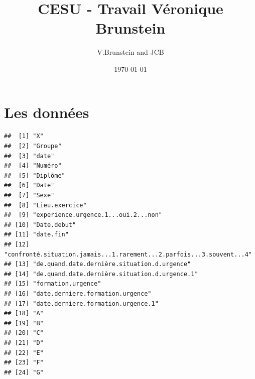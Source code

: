 \documentclass[12pt,english,french]{article}\usepackage{graphicx, color}
\makeatletter
\newenvironment{kframe}{%
 \def\at@end@of@kframe{}%
 \ifinner\ifhmode%
  \def\at@end@of@kframe{\end{minipage}}%
  \begin{minipage}{\columnwidth}%
 \fi\fi%
 \def\FrameCommand##1{\hskip\@totalleftmargin \hskip-\fboxsep
 \colorbox{shadecolor}{##1}\hskip-\fboxsep
     \hskip-\linewidth \hskip-\@totalleftmargin \hskip\columnwidth}%
 \MakeFramed {\advance\hsize-\width
   \@totalleftmargin\z@ \linewidth\hsize
   \@setminipage}}%
 {\par\unskip\endMakeFramed%
 \at@end@of@kframe}
\newenvironment{knitrout}{}{} %
\makeatother
\begin{document}
\title{CESU - Travail Véronique Brunstein}
\author{V.Brunstein and JCB}
\date{\today}
\maketitle

\section{Les données}

\begin{knitrout}
\color{fgcolor}\begin{kframe}
\begin{verbatim}
##  [1] "X"                                                                  
##  [2] "Groupe"                                                             
##  [3] "date"                                                               
##  [4] "Numéro"                                                             
##  [5] "Diplôme"                                                            
##  [6] "Date"                                                               
##  [7] "Sexe"                                                               
##  [8] "Lieu.exercice"                                                      
##  [9] "experience.urgence.1...oui.2...non"                                 
## [10] "Date.debut"                                                         
## [11] "date.fin"                                                           
## [12] "confronté.situation.jamais...1.rarement...2.parfois...3.souvent...4"
## [13] "de.quand.date.dernière.situation.d.urgence"                         
## [14] "de.quand.date.dernière.situation.d.urgence.1"                       
## [15] "formation.urgence"                                                  
## [16] "date.derniere.formation.urgence"                                    
## [17] "date.derniere.formation.urgence.1"                                  
## [18] "A"                                                                  
## [19] "B"                                                                  
## [20] "C"                                                                  
## [21] "D"                                                                  
## [22] "E"                                                                  
## [23] "F"                                                                  
## [24] "G"                                                                  

\end{verbatim}
\end{kframe}
\end{knitrout}
\end{document}
